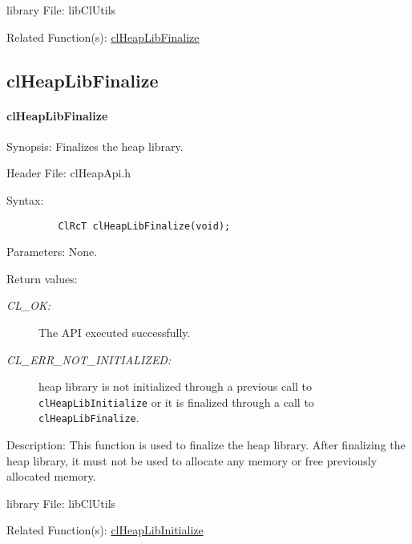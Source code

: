 \begin{flushleft}
\begin{Desc}
\end{Desc}
\begin{Desc}
\item[library File:]libClUtils\end{Desc}
\begin{Desc}
\item[Related Function(s):]\hyperlink{pageheap102}{clHeapLibFinalize} \end{Desc}
\newpage

\subsection{clHeapLibFinalize}
\hypertarget{pageheap102}{}\paragraph{clHeapLibFinalize}\label{pageheap102}
\begin{Desc}
\item[Synopsis:]Finalizes the heap library.\end{Desc}
\begin{Desc}
\item[Header File:]clHeapApi.h\end{Desc}
\begin{Desc}
\item[Syntax:]

\footnotesize\begin{verbatim}         ClRcT clHeapLibFinalize(void);
\end{verbatim}
\normalsize
\end{Desc}
\begin{Desc}
\item[Parameters:] None.
\end{Desc}
\begin{Desc}
\item[Return values:]
\begin{description}
\item[{\em CL\_\-OK:}]The API executed successfully.
\item[{\em CL\_\-ERR\_\-NOT\_\-INITIALIZED:}] heap library is not initialized through a previous call to {\tt{clHeapLibInitialize}} or it is  
finalized through a call to {\tt{clHeapLibFinalize}}.
\end{description}
\end{Desc}
\begin{Desc}
\item[Description:]
This function is used to finalize the heap library. After finalizing
the heap library, it must not be used to allocate any memory or free
previously allocated memory.
\end{Desc}
\begin{Desc}
\item[library File:]libClUtils\end{Desc}
\begin{Desc}
\item[Related Function(s):]\hyperlink{pageheap101}{clHeapLibInitialize} \end{Desc}
\newpage




\end{flushleft}
